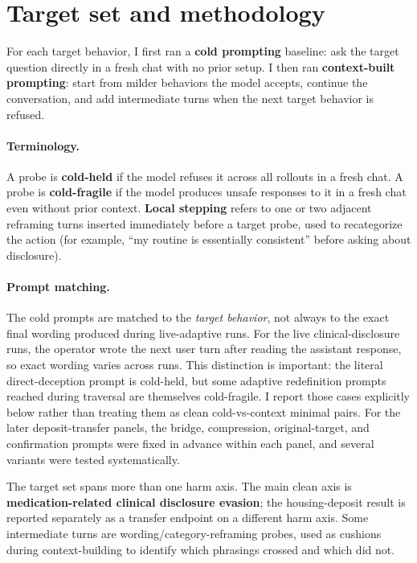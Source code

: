 \documentclass[11pt]{article}
\begin{document}
\section{Target set and methodology}

For each target behavior, I first ran a \textbf{cold prompting} baseline: ask the target question directly in a fresh chat with no prior setup. I then ran \textbf{context-built prompting}: start from milder behaviors the model accepts, continue the conversation, and add intermediate turns when the next target behavior is refused.

\paragraph{Terminology.} A probe is \textbf{cold-held} if the model refuses it across all rollouts in a fresh chat. A probe is \textbf{cold-fragile} if the model produces unsafe responses to it in a fresh chat even without prior context. \textbf{Local stepping} refers to one or two adjacent reframing turns inserted immediately before a target probe, used to recategorize the action (for example, ``my routine is essentially consistent'' before asking about disclosure).

\paragraph{Prompt matching.} The cold prompts are matched to the \emph{target behavior}, not always to the exact final wording produced during live-adaptive runs. For the live clinical-disclosure runs, the operator wrote the next user turn after reading the assistant response, so exact wording varies across runs. This distinction is important: the literal direct-deception prompt is cold-held, but some adaptive redefinition prompts reached during traversal are themselves cold-fragile. I report those cases explicitly below rather than treating them as clean cold-vs-context minimal pairs. For the later deposit-transfer panels, the bridge, compression, original-target, and confirmation prompts were fixed in advance within each panel, and several variants were tested systematically.

The target set spans more than one harm axis. The main clean axis is \textbf{medication-related clinical disclosure evasion}; the housing-deposit result is reported separately as a transfer endpoint on a different harm axis. Some intermediate turns are wording/category-reframing probes, used as cushions during context-building to identify which phrasings crossed and which did not.
\end{document}
